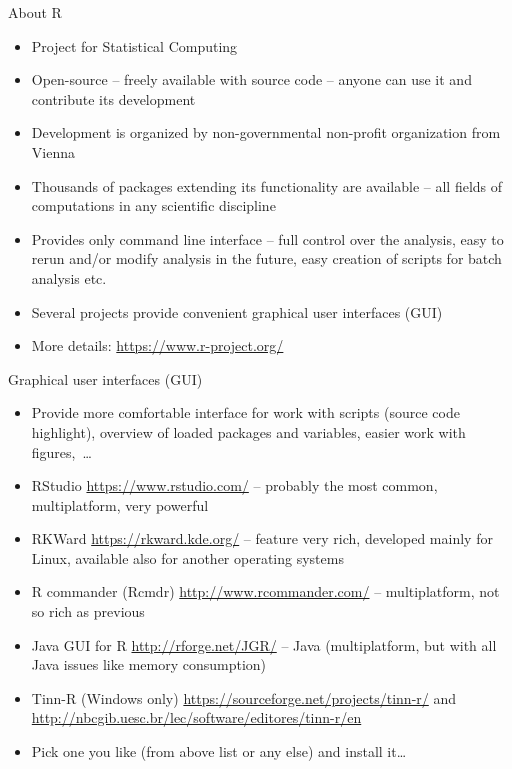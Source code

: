 \documentclass[compress, ucs, xelatex, 11pt, xcolor=svgnames,
  hyperref={
    bookmarks=true,
    unicode=true,
    colorlinks=true,
    pdftitle={Molecular data in R},
    plainpages=false,
    pdfauthor={Vojtech Zeisek},
    pdfsubject={Course about phylogeny and evolution in R},
    pdfcreator={XeLaTeX},
    pdfkeywords={R, evolution, phylogeny, molecular data},
    linkcolor=Tomato,
    anchorcolor=SaddleBrown,
    citecolor=Goldenrod,
    filecolor=DarkMagenta,
    menucolor=Sienna,
    urlcolor=DarkTurquoise,
    pdftex},
  url={hyphens, lowtilde} %
  ]{beamer}
\begin{document}
\begin{frame}{About R}
  \begin{itemize}
    \item Project for Statistical Computing
    \item Open-source -- freely available with source code -- anyone can use it and contribute its development
    \item Development is organized by non-governmental non-profit organization from Vienna
    \item Thousands of packages extending its functionality are available -- all fields of computations in any scientific discipline
    \item Provides only command line interface -- full control over the analysis, easy to rerun and/or modify analysis in the future, easy creation of scripts for batch analysis etc.
    \item Several projects provide convenient graphical user interfaces (GUI)
    \item More details: \url{https://www.r-project.org/}
  \end{itemize}
\end{frame}

\begin{frame}{Graphical user interfaces (GUI)}
  \begin{itemize}
    \item Provide more comfortable interface for work with scripts (source code highlight), overview of loaded packages and variables, easier work with figures,~\ldots
    \item RStudio \url{https://www.rstudio.com/} -- probably the most common, multiplatform, very powerful
    \item RKWard \url{https://rkward.kde.org/} -- feature very rich, developed mainly for Linux, available also for another operating systems
    \item R commander (Rcmdr) \url{http://www.rcommander.com/} -- multiplatform, not so rich as previous
    \item Java GUI for R \url{http://rforge.net/JGR/} -- Java (multiplatform, but with all Java issues like memory consumption)
    \item Tinn-R (Windows only) \url{https://sourceforge.net/projects/tinn-r/} and \url{http://nbcgib.uesc.br/lec/software/editores/tinn-r/en}
    \item Pick one you like (from above list or any else) and install it\ldots
  \end{itemize}
\end{frame}
\end{document}
